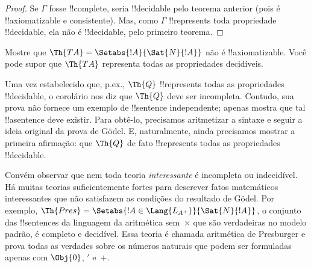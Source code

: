 \documentclass[../../../include/open-logic-section]{subfiles}
\begin{document}
\begin{proof}
Se $\Gamma$ fosse !!{complete}, seria !!{decidable} pelo teorema
anterior (pois é !!{axiomatizable} e consistente). Mas, como $\Gamma$
!!{represents} toda propriedade !!{decidable}, ela não é !!{decidable},
pelo primeiro teorema.
\end{proof}

\begin{prob}
Mostre que $\Th{TA} = \Setabs{!A}{\Sat{N}{!A}}$ não é
!!{axiomatizable}. Você pode supor que $\Th{TA}$ representa todas as
propriedades decidíveis.
\end{prob}

Uma vez estabelecido que, p.ex., $\Th{Q}$ !!{represents} todas
as propriedades !!{decidable}, o corolário nos diz que $\Th{Q}$ deve
ser incompleta. Contudo, sua prova não fornece um exemplo de
!!{sentence} independente; apenas mostra que tal !!a{sentence} deve
existir. Para obtê-lo, precisamos aritmetizar a sintaxe e seguir a ideia
original da prova de G\"odel. E, naturalmente, ainda precisamos mostrar
a primeira afirmação: que $\Th{Q}$ de fato !!{represents} todas as
propriedades !!{decidable}.

Convém observar que nem toda teoria \emph{interessante} é incompleta ou
indecidível. Há muitas teorias suficientemente fortes para descrever
fatos matemáticos interessantes que não satisfazem as condições do
resultado de G\"odel. Por exemplo,
$\Th{Pres} = \Setabs{!A \in \Lang{L_{A^+}}}{\Sat{N}{!A}}$, o conjunto
das !!{sentence}s da linguagem da aritmética sem~$\times$ que são
verdadeiras no modelo padrão, é completo e decidível. Essa teoria é
chamada aritmética de Presburger e prova todas as verdades sobre os
números naturais que podem ser formuladas apenas com $\Obj{0}$,
$\prime$ e~$+$.
\end{document}
